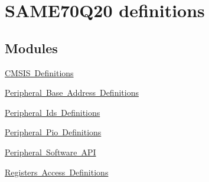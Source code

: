 \hypertarget{group__SAME70Q20__definitions}{}\section{S\+A\+M\+E70\+Q20 definitions}
\label{group__SAME70Q20__definitions}
\subsection*{Modules}
\begin{DoxyCompactItemize}
\item 
\mbox{\hyperlink{group__SAME70Q20__cmsis}{C\+M\+S\+I\+S Definitions}}
\item 
\mbox{\hyperlink{group__SAME70Q20__base}{Peripheral Base Address Definitions}}
\item 
\mbox{\hyperlink{group__SAME70Q20__id}{Peripheral Ids Definitions}}
\item 
\mbox{\hyperlink{group__SAME70Q20__pio}{Peripheral Pio Definitions}}
\item 
\mbox{\hyperlink{group__SAME70Q20__api}{Peripheral Software A\+PI}}
\item 
\mbox{\hyperlink{group__SAME70Q20__reg}{Registers Access Definitions}}
\end{DoxyCompactItemize}
